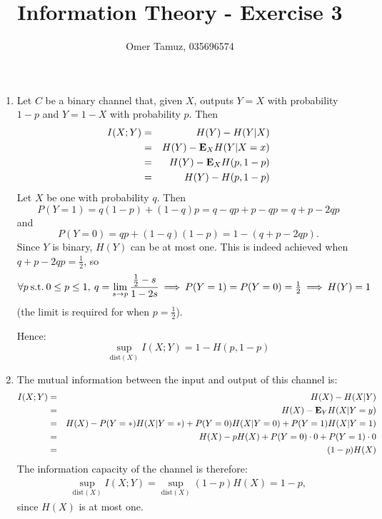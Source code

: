 \documentclass[11pt]{article} \usepackage{amssymb}
\newcommand{\E}{{\bf E}} \newcommand{\Cov}{{\bf Cov}}
\newcommand{\half}{{\textstyle \frac12}}
\begin{document}
\title{Information Theory - Exercise 3}

 \author{Omer Tamuz, 035696574}
\maketitle


\begin{enumerate}
\item
Let $C$ be a binary channel that, given $X$, outputs $Y=X$ with
probability $1-p$ and $Y=1-X$ with probability $p$. Then 
\begin{eqnarray*}
  I(X;Y)&=&H(Y)-H(Y|X)
     \\ &=&H(Y) - \E_XH(Y|X=x) 
     \\ &=&H(Y)-\E_XH(p,1-p)
     \\ &=&H(Y)-H(p,1-p)
\end{eqnarray*}
Let $X$ be one with probability $q$. Then 
\begin{equation*}
P(Y=1)=q(1-p)+(1-q)p=q-qp+p-qp=q+p-2qp  
\end{equation*}
 and
 \begin{equation*}
 P(Y=0)=qp+(1-q)(1-p)=1-(q+p-2qp).
 \end{equation*}
Since $Y$ is binary, $H(Y)$ can be at most one. This is indeed achieved when 
$q+p-2qp=\half$, so
\begin{equation*}
\forall p \: \mbox{s.t.}\: 0\leq p \leq 1, \: q= \lim_{s\to p}{\half-s\over 1-2s}  \:\Longrightarrow\: P(Y=1)=P(Y=0)=\half \:\Longrightarrow\: H(Y)=1
\end{equation*}
(the limit is required for when $p=\half$). 

Hence:
\begin{equation*}
  \sup_{\mbox{dist}(X)}I(X;Y)=1-H(p,1-p)
\end{equation*}
\item
The mutual information between the input and output of this channel is:
\begin{eqnarray*}
  I(X;Y)&=&H(X)-H(X|Y)
   \\   &=&H(X)-\E_YH(X|Y=y)
   \\   &=&H(X)-P(Y=*)H(X|Y=*)+P(Y=0)H(X|Y=0)+P(Y=1)H(X|Y=1)
   \\   &=&H(X)-pH(X)+P(Y=0)\cdot 0+P(Y=1)\cdot 0
   \\   &=&(1-p)H(X)
\end{eqnarray*}
The information capacity of the channel is therefore:
\begin{eqnarray*}
  \sup_{\mbox{dist}(X)}I(X;Y)=\sup_{\mbox{dist}(X)}(1-p)H(X)=1-p,
\end{eqnarray*}
since $H(X)$ is at most one.


\end{enumerate}
\end{document}
